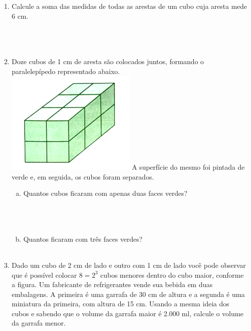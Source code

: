 \documentclass[a4paper,14pt]{article}
\begin{document}
\begin{multicols}{2}
\begin{enumerate}
    		~
\\\\
            \item Calcule a soma das medidas de todas as arestas de um cubo cuja aresta mede 6 cm. \\\\\\\\
            \item Doze cubos de 1 cm de aresta são colocados juntos, formando o paralelepípedo representado abaixo. \\ 
            \includegraphics[width=1\linewidth]{6FMA47_imagens/imagem2}
            A superfície do mesmo foi pintada de verde e, em seguida, os cubos foram separados.
            \begin{enumerate}[a)]
            	\item Quantos cubos ficaram com apenas duas faces verdes? \\\\\\\\
            	\item Quantos ficaram com três faces verdes? \\\\
        	\end{enumerate}
            \item Dado um cubo de 2 cm de lado e outro com 1 cm de lado você pode observar que é possível colocar $8=2^3$ cubos menores dentro do cubo maior, conforme a figura. Um fabricante de refrigerantes vende sua bebida em duas embalagens. A primeira é uma garrafa de 30 cm de altura e a segunda é uma miniatura da primeira, com altura de 15 cm. Usando a mesma ideia dos cubos e sabendo que o volume da garrafa maior é 2.000 ml, calcule o volume da garrafa menor.

\end{enumerate}
\end{multicols}
\end{document}
